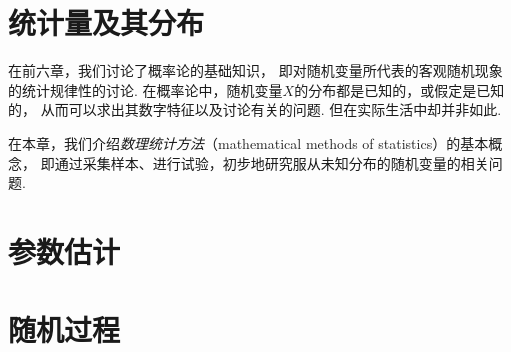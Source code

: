 





\chapter{统计量及其分布}
在前六章，我们讨论了概率论的基础知识，
即对随机变量所代表的客观随机现象的统计规律性的讨论.
在概率论中，随机变量\(X\)的分布都是已知的，或假定是已知的，
从而可以求出其数字特征以及讨论有关的问题.
但在实际生活中却并非如此.

在本章，我们介绍\emph{数理统计方法}（mathematical methods of statistics）的基本概念，
即通过采集样本、进行试验，初步地研究服从未知分布的随机变量的相关问题.








\chapter{参数估计}













\chapter{随机过程}



